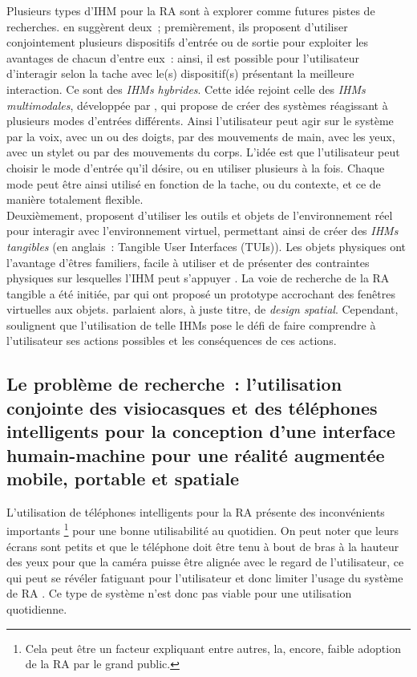 Plusieurs types d'IHM pour la RA sont à explorer comme futures pistes de recherches. \citet{AzumaBaillotBehringerEtAl2001} en suggèrent deux~; premièrement, ils proposent d'utiliser conjointement plusieurs dispositifs d'entrée ou de sortie pour exploiter les avantages de chacun d'entre eux~: ainsi, il est possible pour l'utilisateur d'interagir selon la tache avec le(s) dispositif(s) présentant la meilleure interaction. Ce sont des \emph{IHMs hybrides}. \citep{ZhouDuhBillinghurst2008}  Cette idée rejoint celle des \emph{IHMs multimodales}, développée par \citet{Oviatt2003}, qui propose de créer des systèmes réagissant à plusieurs modes d'entrées différents. Ainsi l'utilisateur peut agir sur le système par la voix, avec un ou des doigts, par des mouvements de main, avec les yeux, avec un stylet ou par des mouvements du corps. L'idée est que l'utilisateur peut choisir le mode d'entrée qu'il désire, ou en utiliser plusieurs à la fois. Chaque mode peut être ainsi utilisé en fonction de la tache, ou du contexte, et ce de manière totalement flexible. \citep{CarmignianiFurhtAnisettiEtAl2011} \\
Deuxièmement, \citet{AzumaBaillotBehringerEtAl2001} proposent d'utiliser les outils et objets de l'environnement réel pour interagir avec l'environnement virtuel, permettant ainsi de créer des \emph{IHMs tangibles} (en anglais~: \foreignlanguage{english}{Tangible User Interfaces (TUIs)}). Les objets physiques ont l'avantage d'êtres familiers, facile à utiliser et de présenter des contraintes physiques sur lesquelles l'IHM peut s'appuyer \citep{ZhouDuhBillinghurst2008}. La voie de recherche de la RA tangible a été initiée, par \citet{FeinerMacIntyreHauptEtAl1993} qui ont proposé un prototype accrochant des fenêtres virtuelles aux objets. \citeauthor{FeinerMacIntyreHauptEtAl1993} parlaient alors, à juste titre, de \emph{design spatial}. Cependant, \citeauthor{ZhouDuhBillinghurst2008} soulignent que l'utilisation de telle IHMs pose le défi de faire comprendre à l'utilisateur ses actions possibles et les conséquences de ces actions.


\subsection*{Le problème de recherche~: l'utilisation conjointe des visiocasques et des téléphones intelligents pour la conception d'une interface humain-machine pour une réalité augmentée mobile, portable et spatiale}
L'utilisation de téléphones intelligents pour la RA présente des inconvénients importants \footnote{Cela peut être un facteur expliquant entre autres, la, encore, faible adoption de la RA par le grand public.} pour une bonne utilisabilité au quotidien. On peut noter que leurs écrans sont petits \citep{DeSaChurchill2013} et que le téléphone doit être tenu à bout de bras à la hauteur des yeux pour que la caméra puisse être alignée avec le regard de l'utilisateur, ce qui peut se révéler fatiguant pour l'utilisateur et donc limiter l'usage du système de RA \citep{Hincapie-RamosGuoMoghadasianEtAl2014}. Ce type de système n'est donc pas viable pour une utilisation quotidienne.

